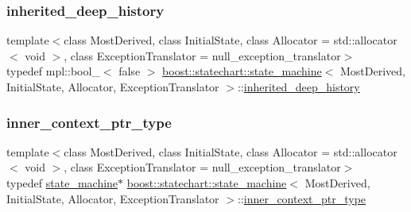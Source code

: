 \subsubsection{\texorpdfstring{inherited\+\_\+deep\+\_\+history}{inherited\_deep\_history}}
{\footnotesize\ttfamily template$<$class Most\+Derived, class Initial\+State, class Allocator = std\+::allocator$<$ void $>$, class Exception\+Translator = null\+\_\+exception\+\_\+translator$>$ \\
typedef mpl\+::bool\+\_\+$<$ false $>$ \mbox{\hyperlink{classboost_1_1statechart_1_1state__machine}{boost\+::statechart\+::state\+\_\+machine}}$<$ Most\+Derived, Initial\+State, Allocator, Exception\+Translator $>$\+::\mbox{\hyperlink{classboost_1_1statechart_1_1state__machine_a98a2ce0dcdc9f2abab9127ce3c1eea67}{inherited\+\_\+deep\+\_\+history}}}

\mbox{\label{classboost_1_1statechart_1_1state__machine_a9943ccf227161502104d8843521b6131}} 
\subsubsection{\texorpdfstring{inner\+\_\+context\+\_\+ptr\+\_\+type}{inner\_context\_ptr\_type}}
{\footnotesize\ttfamily template$<$class Most\+Derived, class Initial\+State, class Allocator = std\+::allocator$<$ void $>$, class Exception\+Translator = null\+\_\+exception\+\_\+translator$>$ \\
typedef \mbox{\hyperlink{classboost_1_1statechart_1_1state__machine}{state\+\_\+machine}}$\ast$ \mbox{\hyperlink{classboost_1_1statechart_1_1state__machine}{boost\+::statechart\+::state\+\_\+machine}}$<$ Most\+Derived, Initial\+State, Allocator, Exception\+Translator $>$\+::\mbox{\hyperlink{classboost_1_1statechart_1_1state__machine_a9943ccf227161502104d8843521b6131}{inner\+\_\+context\+\_\+ptr\+\_\+type}}}

\mbox{\label{classboost_1_1statechart_1_1state__machine_ae051793d49b601dad268a2d1c35c613f}} 
